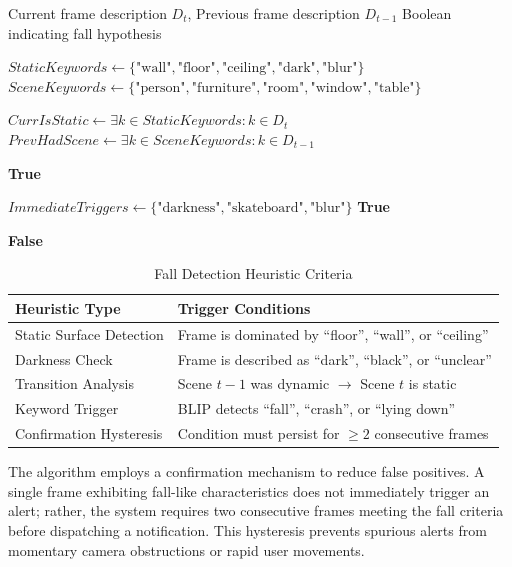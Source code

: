 \documentclass[12pt,a4paper]{report}
\begin{document}
\begin{algorithm}[H]
\caption{Visual Fall Detection Heuristic}
\begin{algorithmic}[1]
\Require Current frame description $D_t$, Previous frame description $D_{t-1}$
\Ensure Boolean indicating fall hypothesis

\State $StaticKeywords \gets \{\text{"wall"}, \text{"floor"}, \text{"ceiling"}, \text{"dark"}, \text{"blur"}\}$
\State $SceneKeywords \gets \{\text{"person"}, \text{"furniture"}, \text{"room"}, \text{"window"}, \text{"table"}\}$

\State $CurrIsStatic \gets \exists k \in StaticKeywords : k \in D_t$
\State $PrevHadScene \gets \exists k \in SceneKeywords : k \in D_{t-1}$

    \State \Return \textbf{True} 
\EndIf

\State $ImmediateTriggers \gets \{\text{"darkness"}, \text{"skateboard"}, \text{"blur"}\}$
    \State \Return \textbf{True} 
\EndIf

\State \Return \textbf{False}
\end{algorithmic}
\end{algorithm}

\begin{table}[H]
\centering
\caption{Fall Detection Heuristic Criteria}
\label{tab:fall_heuristics}
\begin{tabular}{@{}ll@{}}
\toprule
\textbf{Heuristic Type} & \textbf{Trigger Conditions} \\ \midrule
Static Surface Detection & Frame is dominated by ``floor'', ``wall'', or ``ceiling'' \\
Darkness Check & Frame is described as ``dark'', ``black'', or ``unclear'' \\
Transition Analysis & Scene $t-1$ was dynamic $\to$ Scene $t$ is static \\
Keyword Trigger & BLIP detects ``fall'', ``crash'', or ``lying down'' \\
Confirmation Hysteresis & Condition must persist for $\geq 2$ consecutive frames \\ \bottomrule
\end{tabular}
\end{table}

The algorithm employs a confirmation mechanism to reduce false positives. A single frame exhibiting fall-like characteristics does not immediately trigger an alert; rather, the system requires two consecutive frames meeting the fall criteria before dispatching a notification. This hysteresis prevents spurious alerts from momentary camera obstructions or rapid user movements.
\end{document}
